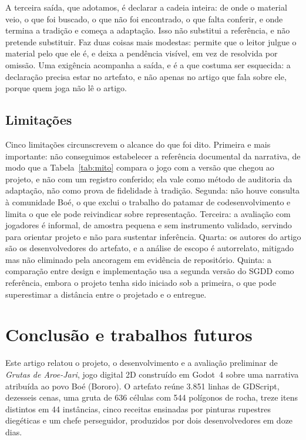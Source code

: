 \documentclass[conference]{IEEEtran}
\begin{document}
A terceira saída, que adotamos, é declarar a cadeia inteira: de onde o material veio, o
que foi buscado, o que não foi encontrado, o que falta conferir, e onde termina a tradição
e começa a adaptação. Isso não substitui a referência, e não pretende substituir. Faz duas
coisas mais modestas: permite que o leitor julgue o material pelo que ele é, e deixa a
pendência visível, em vez de resolvida por omissão. Uma exigência acompanha a saída, e é a
que costuma ser esquecida: a declaração precisa estar no artefato, e não apenas no artigo
que fala sobre ele, porque quem joga não lê o artigo.

\subsection{Limitações}

Cinco limitações circunscrevem o alcance do que foi dito. Primeira e mais importante: não
conseguimos estabelecer a referência documental da narrativa, de modo que a
Tabela~\ref{tab:mito} compara o jogo com a versão que chegou ao projeto, e não com um
registro conferido; ela vale como método de auditoria da adaptação, não como prova de
fidelidade à tradição. Segunda: não houve consulta à comunidade
Boé, o que exclui o trabalho do patamar de codesenvolvimento e limita o que ele pode
reivindicar sobre representação. Terceira: a avaliação com jogadores é informal, de
amostra pequena e sem instrumento validado, servindo para orientar projeto e não para
sustentar inferência. Quarta: os autores do artigo são os desenvolvedores do artefato, e
a análise de escopo é autorrelato, mitigado mas não eliminado pela ancoragem em
evidência de repositório. Quinta: a comparação entre design e implementação usa a
segunda versão do SGDD como referência, embora o projeto tenha sido iniciado sob a
primeira, o que pode superestimar a distância entre o projetado e o entregue.

\section{Conclusão e trabalhos futuros}
\label{sec:conclusao}

Este artigo relatou o projeto, o desenvolvimento e a avaliação preliminar de
\textit{Grutas de Aroe-Jari}, jogo digital 2D construído em Godot~4 sobre uma narrativa
atribuída ao povo Boé (Bororo). O artefato reúne 3.851 linhas de GDScript, dezesseis cenas,
uma gruta de 636 células com 544 polígonos de rocha, treze itens distintos em 44
instâncias, cinco receitas ensinadas por pinturas rupestres diegéticas e um chefe
perseguidor, produzidos por dois desenvolvedores em doze dias.
\end{document}
